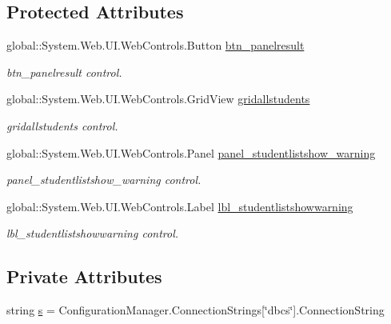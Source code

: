 \subsection*{Protected Attributes}
\begin{DoxyCompactItemize}
\item 
global\+::\+System.\+Web.\+U\+I.\+Web\+Controls.\+Button \mbox{\hyperlink{class_admin__student_list_a039b2be6f84419ecc427d475998959a4}{btn\+\_\+panelresult}}
\begin{DoxyCompactList}\small\item\em btn\+\_\+panelresult control. \end{DoxyCompactList}\item 
global\+::\+System.\+Web.\+U\+I.\+Web\+Controls.\+Grid\+View \mbox{\hyperlink{class_admin__student_list_a7980a4f9d42326c584fbdb37ff09f502}{gridallstudents}}
\begin{DoxyCompactList}\small\item\em gridallstudents control. \end{DoxyCompactList}\item 
global\+::\+System.\+Web.\+U\+I.\+Web\+Controls.\+Panel \mbox{\hyperlink{class_admin__student_list_a9074266e82d0214c4d3ab5ee5cf59a23}{panel\+\_\+studentlistshow\+\_\+warning}}
\begin{DoxyCompactList}\small\item\em panel\+\_\+studentlistshow\+\_\+warning control. \end{DoxyCompactList}\item 
global\+::\+System.\+Web.\+U\+I.\+Web\+Controls.\+Label \mbox{\hyperlink{class_admin__student_list_ad279e6a0907b2ea37346fd7c8992d27e}{lbl\+\_\+studentlistshowwarning}}
\begin{DoxyCompactList}\small\item\em lbl\+\_\+studentlistshowwarning control. \end{DoxyCompactList}\end{DoxyCompactItemize}
\subsection*{Private Attributes}
\begin{DoxyCompactItemize}
\item 
string \mbox{\hyperlink{class_admin__student_list_a3fbb033d41d031ba6bad28fb3e851cb6}{s}} = Configuration\+Manager.\+Connection\+Strings\mbox{[}\char`\"{}dbcs\char`\"{}\mbox{]}.Connection\+String
\end{DoxyCompactItemize}


